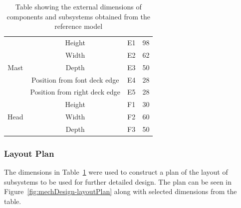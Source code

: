\begin{table}[H]
\begin{tabular}{@{}cccc@{}}
      \multirow{5}{*}{Mast}       & Height                        & E1   & 98    \\
                                  & Width                         & E2   & 62    \\
                                  & Depth                         & E3   & 50    \\
                                  & Position from font deck edge  & E4   & 28    \\
                                  & Position from right deck edge & E5   & 28    \\ \midrule
      \multirow{3}{*}{Head}       & Height                        & F1   & 30    \\
                                  & Width                         & F2   & 60    \\
                                  & Depth                         & F3   & 50    \\ \bottomrule
      \end{tabular}
      \caption{Table showing the external dimensions of components and subsystems obtained from the reference model}
      \label{tab:design-referenceDimensions}
      \end{table}
      
    \subsubsection{Layout Plan}
      The dimensions in Table~\ref{tab:design-referenceDimensions} were used to construct a plan of the layout of subsystems to be used for further detailed design. The plan can be seen in Figure~\ref{fig:mechDesign-layoutPlan} along with selected dimensions from the table.
      
